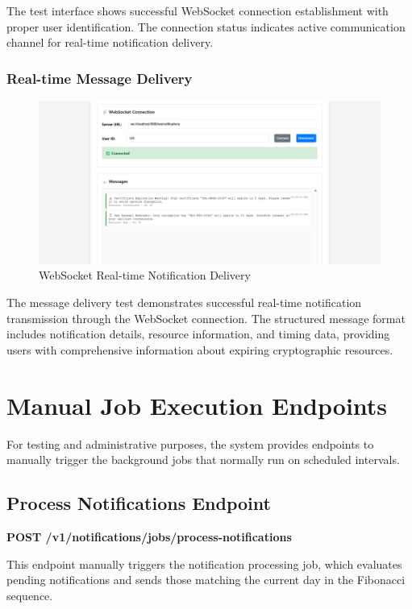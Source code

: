The test interface shows successful WebSocket connection establishment with proper user identification. The connection status indicates active communication channel for real-time notification delivery.

\subsubsection{Real-time Message Delivery}

\begin{figure}[H]
    \centering
    \includegraphics[width=1\textwidth]{images/websocket_message.png}
    \caption{WebSocket Real-time Notification Delivery}
    \label{fig:websocket_message}
\end{figure}

The message delivery test demonstrates successful real-time notification transmission through the WebSocket connection. The structured message format includes notification details, resource information, and timing data, providing users with comprehensive information about expiring cryptographic resources.

\section{Manual Job Execution Endpoints}

For testing and administrative purposes, the system provides endpoints to manually trigger the background jobs that normally run on scheduled intervals.

\subsection{Process Notifications Endpoint}

\textbf{POST /v1/notifications/jobs/process-notifications}

This endpoint manually triggers the notification processing job, which evaluates pending notifications and sends those matching the current day in the Fibonacci sequence.

